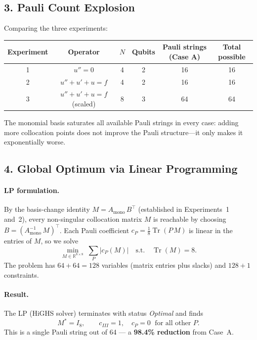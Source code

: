 \documentclass{article}
\begin{document}
\subsection*{3. Pauli Count Explosion}

Comparing the three experiments:

\begin{center}
\begin{tabular}{cccccc}
\toprule
Experiment & Operator & $N$ & Qubits & Pauli strings (Case A) & Total possible \\
\midrule
1 & $u''=0$                   & 4 & 2 & 16 & 16 \\
2 & $u''+u'+u=f$              & 4 & 2 & 16 & 16 \\
3 & $u''+u'+u=f$ (scaled)     & 8 & 3 & 64 & 64 \\
\bottomrule
\end{tabular}
\end{center}

The monomial basis saturates all available Pauli strings in every case: adding
more collocation points does not improve the Pauli structure---it only makes it
exponentially worse.

\subsection*{4. Global Optimum via Linear Programming}

\paragraph{LP formulation.}
By the basis-change identity $M = A_{\mathrm{mono}}\,B^{\top}$ (established in
Experiments~1 and~2), every non-singular collocation matrix $M$ is reachable by
choosing $B = (A_{\mathrm{mono}}^{-1}\,M)^{\top}$.  Each Pauli coefficient
$c_P = \tfrac{1}{8}\operatorname{Tr}(P\,M)$ is linear in the entries of $M$, so
we solve
\begin{equation}
    \min_{M \in \mathbb{R}^{8\times 8}}\;\sum_{P}|c_P(M)|
    \quad\text{s.t.}\quad \operatorname{Tr}(M) = 8.
\end{equation}
The problem has $64 + 64 = 128$ variables (matrix entries plus slacks) and
$128 + 1$ constraints.

\paragraph{Result.}
The LP (HiGHS solver) terminates with status \emph{Optimal} and finds
\begin{equation}
    M^* = I_8,
    \qquad
    c_{III} = 1, \quad c_P = 0 \;\text{ for all other } P.
\end{equation}
This is a single Pauli string out of 64 — a \textbf{98.4\% reduction} from
Case~A.
\end{document}

